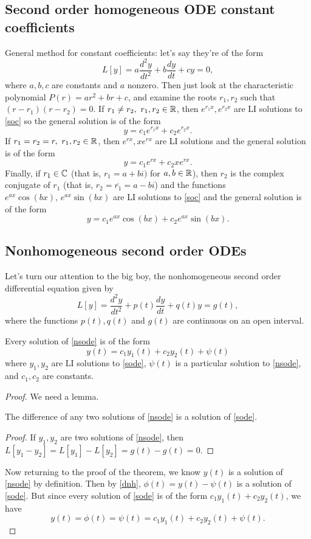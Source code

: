 \subsection{Second order homogeneous ODE constant coefficients}
General method for constant coefficients: let's say they're of the form 
\begin{equation}\label{soc}
    L[y]=a \frac{d^2y}{dt^2}+b \frac{dy}{dt}+cy=0,
\end{equation}
where $a,b,c$ are constants and $a$ nonzero. Then just look at the characteristic polynomial $P(r)=ar^2+br+c$, and examine the roots $r_1,r_2$ such that $(r-r_1)(r-r_2)=0$. If $r_1\neq r_2,\ r_1,r_2\in \mathbb{R}$, then $e^{r_1x},e^{r_2x}$ are LI solutions to \cref{soc} so the general solution is of the form \[
y=c_1e^{r_1x}+c_2e^{r_2x}.
\] If $r_1=r_2=r, \ r_1,r_2\in \mathbb{R}$, then $e^{rx},xe^{rx}$ are LI solutions and the general solution is of the form \[
y=c_1e^{rx}+c_2xe^{rx}.
\] Finally, if $r_1\in \mathbb{C}$ (that is, $r_1=a+bi)$ for $a,b\in \mathbb{R}$), then $r_2$ is the complex conjugate of $r_1$ (that is, $r_2=\overline{r_1}=a-bi$) and the functions $e^{ax}\cos(bx),\,e^{ax}\sin(bx)$ are LI solutions to \cref{soc} and the general solution is of the form \[
y=c_1e^{ax}\cos(bx)+c_2e^{ax}\sin(bx).
\] 
\subsection{Nonhomogeneous second order ODEs}
Let's turn our attention to the big boy, the nonhomogeneous second order differential equation given by
\begin{equation}\label{nsode}
    L[y]=\frac{d^2y}{dt^2}+p(t) \frac{dy}{dt}+q(t)y=g(t),
\end{equation}
where the functions $p(t),q(t)$ and $g(t)$ are continuous on an open interval.
\begin{theorem}
    Every solution of \cref{nsode} is of the form \[
        y(t)=c_1y_1(t)+c_2y_2(t)+\psi(t)
    \] where $y_1,y_2$ are LI solutions to \cref{sode}, $\psi(t)$ is a particular solution to \cref{nsode}, and $c_1,c_2$ are constants.
\end{theorem}
\begin{proof}
    We need a lemma.
    \begin{lemma}\label{dnh}
    The difference of any two solutions of \cref{nsode} is a solution of \cref{sode}.
\end{lemma}
\begin{proof}
    If $y_1,y_2$ are two solutions of \cref{nsode}, then $L[y_1-y_2]=L[y_1]-L[y_2]=g(t)-g(t)=0.$
\end{proof}
Now returning to the proof of the theorem, we know $y(t)$ is a solution of \cref{nsode} by definition. Then by \cref{dnh}, $\phi (t)=y(t)-\psi(t)$ is a solution of \cref{sode}. But since every solution of \cref{sode} is of the form $c_1y_1(t)+c_2y_2(t)$, we have \[
    y(t)=\phi(t)=\psi(t)=c_1y_1(t)+c_2y_2(t)+\psi(t).
\] 
\end{proof}
